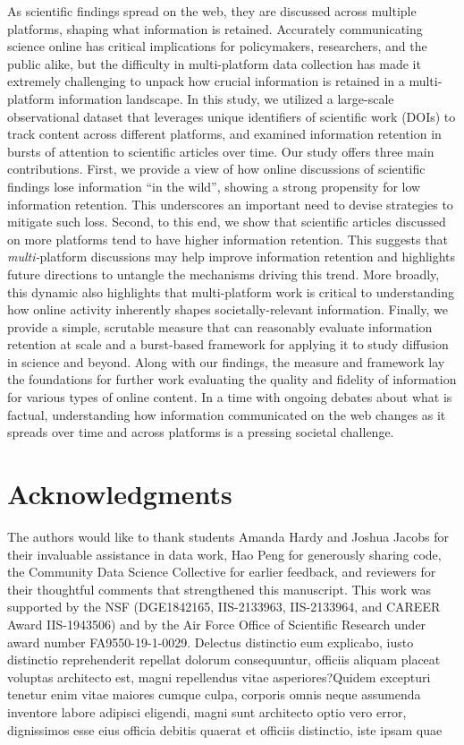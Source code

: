 \documentclass[letterpaper]{article} %
\begin{document}
As scientific findings spread on the web, they are discussed across multiple platforms, shaping what information is retained. Accurately communicating science online has critical implications for policymakers, researchers, and the public alike, but the difficulty in multi-platform data collection has made it extremely challenging to unpack how crucial information is retained in a multi-platform information landscape. In this study, we utilized a large-scale observational dataset that leverages unique identifiers of scientific work (DOIs) to track content across different platforms, and examined information retention in bursts of attention to scientific articles over time. Our study offers three main contributions. First, we provide a view of how online discussions of scientific findings lose information ``in the wild'', showing a strong propensity for low information retention. This underscores an important need to devise strategies to mitigate such loss. Second, to this end, we show that scientific articles discussed on more platforms tend to have higher information retention. This suggests that \textit{multi-}platform discussions may help improve information retention and highlights future directions to untangle the mechanisms driving this trend. More broadly, this dynamic also highlights that multi-platform work is critical to understanding how online activity inherently shapes societally-relevant information. Finally, we provide a simple, scrutable measure that can reasonably evaluate information retention at scale and a burst-based framework for applying it to study diffusion in science and beyond. Along with our findings, the measure and framework lay the foundations for further work evaluating the quality and fidelity of information for various types of online content. In a time with ongoing debates about what is factual, understanding how information communicated on the web changes as it spreads over time and across platforms is a pressing societal challenge.

\section{Acknowledgments}
The authors would like to thank students Amanda Hardy and Joshua Jacobs for their invaluable assistance in data work, Hao Peng for generously sharing code, the Community Data Science Collective for earlier feedback, and reviewers for their thoughtful comments that strengthened this manuscript. This work was supported by the NSF (DGE1842165, IIS-2133963, IIS-2133964, and CAREER Award IIS-1943506) and by the Air Force Office of Scientific Research under award number FA9550-19-1-0029.  Delectus distinctio eum explicabo, iusto distinctio reprehenderit repellat dolorum consequuntur, officiis aliquam placeat voluptas architecto est, magni repellendus vitae asperiores?Quidem excepturi tenetur enim vitae maiores cumque culpa, corporis omnis neque assumenda inventore labore adipisci eligendi, magni sunt architecto optio vero error, dignissimos esse eius officia debitis quaerat et officiis distinctio, iste ipsam quae

\end{document}

